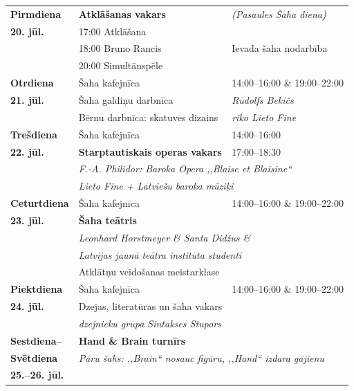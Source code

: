 \documentclass[a4paper,10pt]{article}
\begin{document}
\begin{center}
\begin{minipage}{0.90\paperwidth}
\setlength{\parskip}{0pt}
\begin{tabularx}{\linewidth}{@{} p{2.4cm} p{5.2cm} X @{}}
\toprule[0.6pt]
\textbf{Pirmdiena}   & \textbf{Atklāšanas vakars}                        & \textit{(Pasaules Šaha diena)}\\
\textbf{20. jūl.}    & 17:00 Atklāšana                                   & \\
                     & 18:00 Bruno Rancis                                & Ievada šaha nodarbība\\
                     & 20:00 Simultānspēle                               & \\[3pt]
\textbf{Otrdiena}    & Šaha kafejnīca                                    & 14:00–16:00 \& 19:00–22:00\\
\textbf{21. jūl.}    & Šaha galdiņu darbnīca                             & \textit{Rūdolfs Bekičs}\\
                     & Bērnu darbnīca: skatuves dizains                  & \textit{rīko Lieto Fine}\\[3pt]
\textbf{Trešdiena}   & Šaha kafejnīca                                    & 14:00–16:00\\
\textbf{22. jūl.}    & \textbf{Starptautiskais operas vakars}             & 17:00–18:30\\
                     & \multicolumn{2}{l}{\textit{F.-A. Philidor: Baroka Opera ,,Blaise et Blaisine``}}\\
                     & \multicolumn{2}{l}{\textit{Lieto Fine + Latviešu baroka mūziķi}}\\[3pt]
\textbf{Ceturtdiena} & Šaha kafejnīca                                    & 14:00–16:00 \& 19:00–22:00\\
\textbf{23. jūl.}    & \textbf{Šaha teātris}                             & \\
                     & \multicolumn{2}{l}{\textit{Leonhard Horstmeyer \& Santa Did\v{z}us \&}}\\
                     & \multicolumn{2}{l}{\textit{Latvijas jaunā teātra institūta studenti}}\\
                     & Atklātņu veidošanas meistarklase                  & \\[3pt]
\textbf{Piektdiena}  & Šaha kafejnīca                                    & 14:00–16:00 \& 19:00–22:00\\
\textbf{24. jūl.}    & Dzejas, literatūras un šaha vakars                & \\
                     & \multicolumn{2}{l}{\textit{dzejnieku grupa Sintakses Stupors}}\\[3pt]
\textbf{Sestdiena–}  & \textbf{Hand \& Brain turnīrs}                    & \\
\textbf{Svētdiena}   & \multicolumn{2}{l}{\textit{Pāru šahs: ,,Brain`` nosauc figūru, ,,Hand`` izdara gājienu}}\\
\textbf{25.–26. jūl.}&                                                   & \\
\bottomrule[0.6pt]
\end{tabularx}


\end{minipage}
\end{center}
\end{document}
